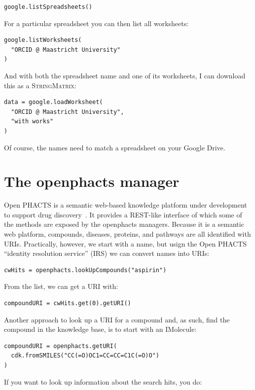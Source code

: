 \documentclass[a5paper, 10pt]{memoir}
\begin{document}
\begin{refsection}
\begin{Verbatim}
google.listSpreadsheets()
\end{Verbatim}

For a particular spreadsheet you can then list all worksheets:

\begin{Verbatim}
google.listWorksheets(
  "ORCID @ Maastricht University"
)
\end{Verbatim}

And with both the spreadsheet name and one of its worksheets, I can download
this as a \textsc{StringMatrix}:

\begin{Verbatim}
data = google.loadWorksheet(
  "ORCID @ Maastricht University",
  "with works"
)
\end{Verbatim}

Of course, the names need to match a spreadsheet on your Google Drive.

\section{The openphacts manager}

Open PHACTS is a semantic web-based knowledge platform under
development to support drug discovery~\cite{Williams2012}. It provides a
REST-like interface of which some of the methods are exposed by the openphacts
managers. Because it is a semantic web platform, compounds, diseases, proteins,
and pathways are all identified with URIs. Practically, however, we start with
a name, but usign the Open PHACTS ``identity resolution service'' (IRS) we can
convert names into URIs:

\begin{Verbatim}
cwHits = openphacts.lookUpCompounds("aspirin")
\end{Verbatim}
From the list, we can get a URI with:

\begin{Verbatim}
compoundURI = cwHits.get(0).getURI()
\end{Verbatim}
Another approach to look up a URI for a compound and, as such, find the
compound in the knowledge base, is to start with an IMolecule:

\begin{Verbatim}
compoundURI = openphacts.getURI(
  cdk.fromSMILES("CC(=O)OC1=CC=CC=C1C(=O)O")
)
\end{Verbatim}
If you want to look up information about the search hits, you do:


\end{refsection}
\end{document}
